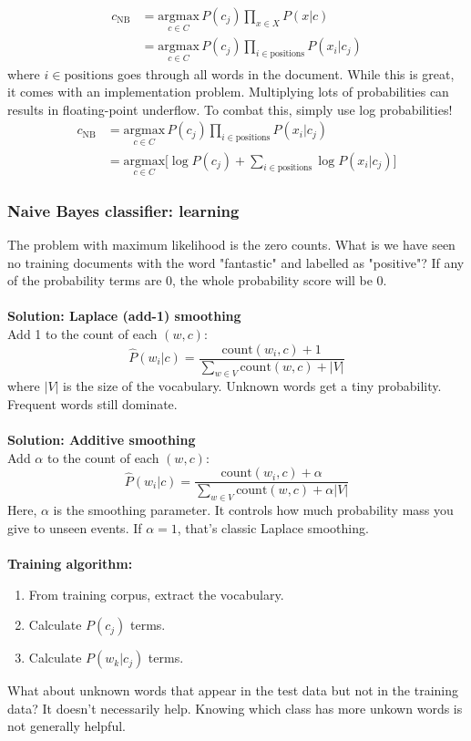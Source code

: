 \documentclass[11pt]{article}
\begin{document}
\begin{align*}
    c_{\text{NB}}&=\underset{c\in C}{\text{argmax}}\hspace{2pt}P(c_j)\prod_{x\in X}P(x|c) \\
    &= \underset{c\in C}{\text{argmax}}\hspace{2pt}P(c_j)\prod_{i\in\text{positions}}P(x_i|c_j)
\end{align*}
where $i\in\text{positions}$ goes through all words in the document. While this is great, it comes with an implementation problem. Multiplying lots of probabilities can results in floating-point underflow. To combat this, simply use log probabilities!
\begin{align*}
    c_{\text{NB}}&=\underset{c\in C}{\text{argmax}}\hspace{2pt}P(c_j)\prod_{i\in\text{positions}}P(x_i|c_j) \\
    &=\underset{c\in C}{\text{argmax}}\Big[\log P(c_j)+\sum_{i\in\text{positions}}\log P(x_i|c_j)\Big]
\end{align*}

\subsubsection{Naive Bayes classifier: learning}
The problem with maximum likelihood is the zero counts. What is we have seen no training documents with the word "fantastic" and labelled as "positive"? If any of the probability terms are 0, the whole probability score will be 0.
\\\\
\textbf{Solution: Laplace (add-1) smoothing} \\
Add 1 to the count of each $(w,c)$:
$$
\hat{P}(w_i|c)=\frac{\text{count}(w_i,c)+1}{\sum_{w\in V}\text{count}(w,c)+|V|}
$$
where $|V|$ is the size of the vocabulary. Unknown words get a tiny probability. Frequent words still dominate.
\\\\
\textbf{Solution: Additive smoothing}\\
Add $\alpha$ to the count of each $(w,c)$:
$$
\hat{P}(w_i|c)=\frac{\text{count}(w_i,c)+\alpha}{\sum_{w\in V}\text{count}(w,c)+\alpha|V|}
$$
Here, $\alpha$ is the smoothing parameter. It controls how much probability mass you give to unseen events. If $\alpha=1$, that's classic Laplace smoothing.
\\\\
\textbf{Training algorithm:}
\begin{enumerate}
    \item From training corpus, extract the vocabulary.
    \item Calculate $P(c_j)$ terms.
    \item Calculate $P(w_k|c_j)$ terms.
\end{enumerate}
\begin{note}[Extra]
What about unknown words that appear in the test data but not in the training data? It doesn't necessarily help. Knowing which class has more unkown words is not generally helpful.
\end{note}
\end{document}

